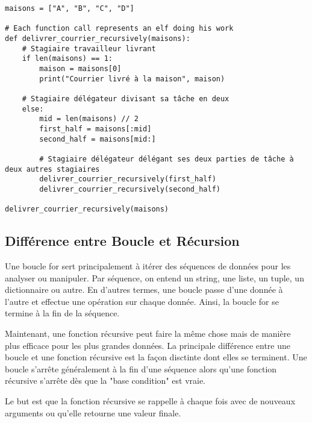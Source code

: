 \begin{verbatim}
maisons = ["A", "B", "C", "D"]

# Each function call represents an elf doing his work 
def delivrer_courrier_recursively(maisons):
    # Stagiaire travailleur livrant
    if len(maisons) == 1:
        maison = maisons[0]
        print("Courrier livré à la maison", maison)

    # Stagiaire délégateur divisant sa tâche en deux
    else:
        mid = len(maisons) // 2
        first_half = maisons[:mid]
        second_half = maisons[mid:]

        # Stagiaire délégateur délégant ses deux parties de tâche à deux autres stagiaires
        delivrer_courrier_recursively(first_half)
        delivrer_courrier_recursively(second_half)
        
delivrer_courrier_recursively(maisons)
\end{verbatim}

\subsection{Différence entre Boucle et Récursion}

Une boucle for sert principalement à itérer des séquences de données pour les analyser ou manipuler. Par séquence, on entend un string, une liste, un tuple, un dictionnaire ou autre. En d'autres termes, une boucle passe d'une donnée à l'autre et effectue une opération sur chaque donnée. Ainsi, la boucle for se termine à la fin de la séquence. 

Maintenant, une fonction récursive peut faire la même chose mais de manière plus efficace pour les plus grandes données. La principale différence entre une boucle et une fonction récursive est la façon disctinte dont elles se terminent. Une boucle s'arrête généralement à la fin d'une séquence alors qu'une fonction récursive s'arrête dès que la "base condition" est vraie. 

Le but est que la fonction récursive se rappelle à chaque fois avec de nouveaux arguments ou qu'elle retourne une valeur finale.

